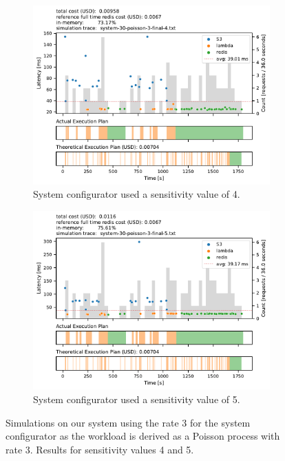 \begin{figure}[pht!]
    \centering
    \begin{subfigure}{.8\textwidth}
        \includegraphics[width=\linewidth]{figures/system-30-poisson-3-final-4.pdf}
        \caption{System configurator used a sensitivity value of 4.}
        \label{fig:poisson_3_4}
    \end{subfigure}
    \begin{subfigure}{.8\textwidth}
        \includegraphics[width=\linewidth]{figures/system-30-poisson-3-final-5.pdf}
        \caption{System configurator used a sensitivity value of 5.}
        \label{fig:poisson_3_5}
    \end{subfigure}
    \caption{Simulations on our system using the rate 3 for the system configurator as the workload is derived as a Poisson process with rate 3. Results for sensitivity values 4 and 5.}
    \label{fig:poisson_3_45}
\end{figure}

